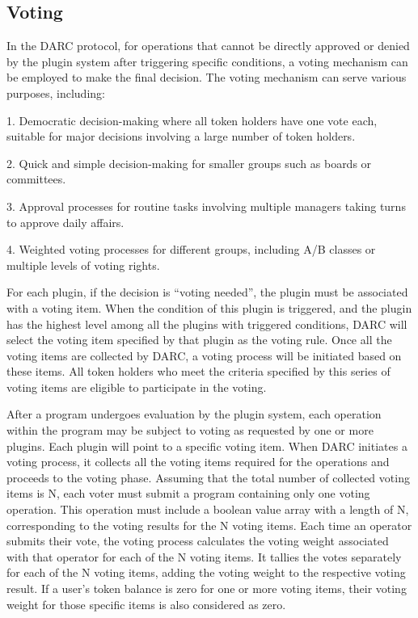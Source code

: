 \documentclass[main.tex]{subfiles}
\begin{document}
\subsection{Voting}

In the DARC protocol, for operations that cannot be directly approved or denied by the plugin system after triggering specific conditions, a voting mechanism can be employed to make the final decision. The voting mechanism can serve various purposes, including:

1. Democratic decision-making where all token holders have one vote each, suitable for major decisions involving a large number of token holders.

2. Quick and simple decision-making for smaller groups such as boards or committees.

3. Approval processes for routine tasks involving multiple managers taking turns to approve daily affairs.

4. Weighted voting processes for different groups, including A/B classes or multiple levels of voting rights.

For each plugin, if the decision is ``voting needed'', the plugin must be associated with a voting item. When the condition of this plugin is triggered, and the plugin has the highest level among all the plugins with triggered conditions, DARC will select the voting item specified by that plugin as the voting rule. Once all the voting items are collected by DARC, a voting process will be initiated based on these items. All token holders who meet the criteria specified by this series of voting items are eligible to participate in the voting.

After a program undergoes evaluation by the plugin system, each operation within the program may be subject to voting as requested by one or more plugins. Each plugin will point to a specific voting item. When DARC initiates a voting process, it collects all the voting items required for the operations and proceeds to the voting phase. Assuming that the total number of collected voting items is N, each voter must submit a program containing only one voting operation. This operation must include a boolean value array with a length of N, corresponding to the voting results for the N voting items. Each time an operator submits their vote, the voting process calculates the voting weight associated with that operator for each of the N voting items. It tallies the votes separately for each of the N voting items, adding the voting weight to the respective voting result. If a user's token balance is zero for one or more voting items, their voting weight for those specific items is also considered as zero.
\end{document}
